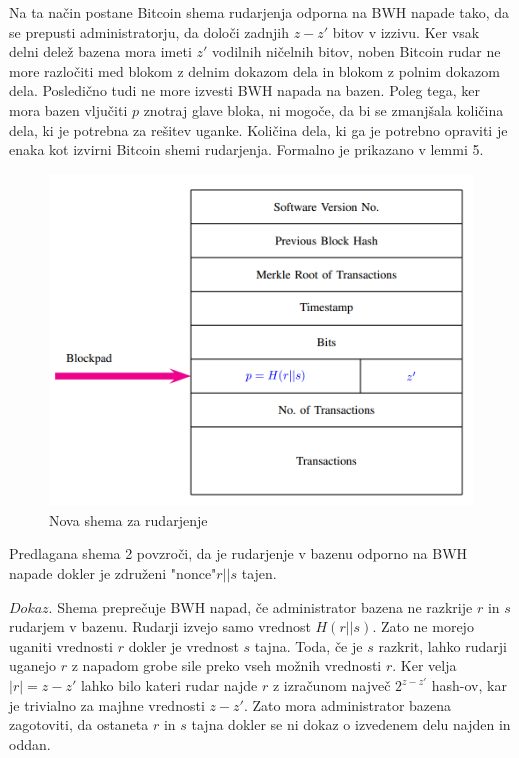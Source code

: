 \documentclass{acm_proc_article-sp}
\begin{document}
Na ta način postane Bitcoin shema rudarjenja odporna na BWH napade tako, da se prepusti administratorju, da določi zadnjih \textit{$z - z'$} bitov v izzivu. Ker vsak delni delež bazena mora imeti \textit{$z'$} vodilnih ničelnih bitov, noben Bitcoin rudar ne more razločiti med blokom z delnim dokazom dela in blokom z polnim dokazom dela. Posledično tudi ne more izvesti BWH napada na bazen. Poleg tega, ker mora bazen vljučiti \textit{$p$} znotraj glave bloka, ni mogoče, da bi se zmanjšala količina dela, ki je potrebna za rešitev uganke. Količina dela, ki ga je potrebno opraviti je enaka kot izvirni Bitcoin shemi rudarjenja. Formalno je prikazano v lemmi 5.

\begin{figure}
  \includegraphics[scale=0.30]{image10.png}
  \caption{Nova shema za rudarjenje}
  \label{fig:boat3}
\end{figure}

\begin{lema}\label{lema5}
	Predlagana shema 2 povzroči, da je rudarjenje v bazenu odporno na BWH napade dokler je združeni "nonce"\textit{$r||s$} tajen.
\end{lema}

\noindent\textit{$Dokaz$}. Shema preprečuje BWH napad, če administrator bazena ne razkrije \textit{$r$} in \textit{$s$} rudarjem v bazenu. Rudarji izvejo samo vrednost \textit{$H(r||s)$}. Zato ne morejo uganiti vrednosti \textit{$r$} dokler je vrednost \textit{$s$} tajna. Toda, če je \textit{$s$} razkrit, lahko rudarji uganejo \textit{$r$} z napadom grobe sile preko vseh možnih  vrednosti \textit{$r$}. Ker velja \textit{$|r| = z - z'$} lahko bilo kateri rudar najde \textit{$r$} z izračunom največ \textit{$2^{z-z'}$} hash-ov, kar je trivialno za majhne vrednosti \textit{$z - z'$}. Zato mora administrator bazena zagotoviti, da ostaneta \textit{$r$} in \textit{$s$} tajna dokler se ni dokaz o izvedenem delu najden in oddan.
\end{document}
